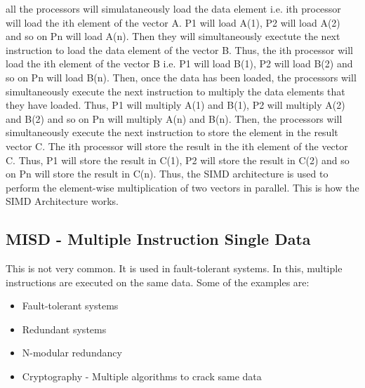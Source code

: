\documentclass[12pt]{article}
\begin{document}
all the processors will simulataneously load the data element i.e. ith processor will load the ith element of the vector A.
P1 will load A(1), P2 will load A(2) and so on Pn will load A(n). Then they will simultaneously exectute the next instruction to load the data element of the vector B. 
Thus, the ith processor will load the ith element of the vector B i.e. P1 will load B(1), P2 will load B(2) and so on Pn will load B(n). 
Then, once the data has been loaded, the processors will simultaneously execute the next instruction to multiply the data elements that they have loaded.
Thus, P1 will multiply A(1) and B(1), P2 will multiply A(2) and B(2) and so on Pn will multiply A(n) and B(n). 
Then, the processors will simultaneously execute the next instruction to store the element in the result vector C. The ith processor will store the result in the ith element of the vector C.
Thus, P1 will store the result in C(1), P2 will store the result in C(2) and so on Pn will store the result in C(n).
Thus, the SIMD architecture is used to perform the element-wise multiplication of two vectors in parallel. This is how the SIMD Architecture works.
\subsection{MISD - Multiple Instruction Single Data}
This is not very common. It is used in fault-tolerant systems. In this, multiple instructions are executed on the same data.
Some of the examples are:
\begin{itemize}
    \item Fault-tolerant systems
    \item Redundant systems
    \item N-modular redundancy
    \item Cryptography - Multiple algorithms to crack same data
\end{itemize}
\end{document}
